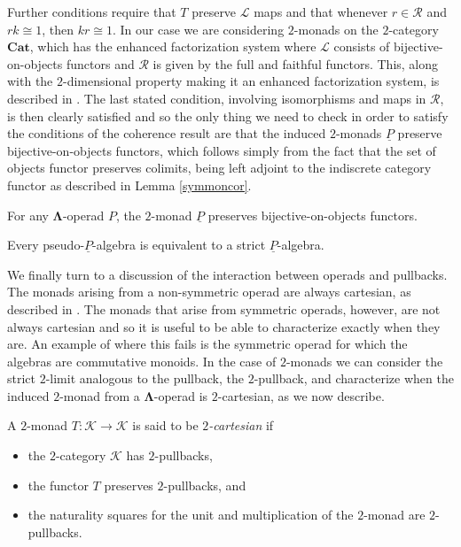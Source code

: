 \documentclass{amsbook} %
\newcommand{\m}[1]{\mathcal{#1}}
\newcommand{\ML}{\mathbf{\Lambda}}
\numberwithin{section}{chapter}
\begin{document}
Further conditions require that $T$ preserve $\mathcal{L}$ maps and that whenever $r \in \mathcal{R}$ and $rk \cong 1$, then $kr \cong 1$. In our case we are considering $2$-monads on the $2$-category $\mathbf{Cat}$, which has the enhanced factorization system where $\m{L}$ consists of bijective-on-objects functors and $\m{R}$ is given by the full and faithful functors. This, along with the $2$-dimensional property making it an enhanced factorization system, is described in \cite{power-gen}. The last stated condition, involving isomorphisms and maps in $\m{R}$, is then clearly satisfied and so the only thing we need to check in order to satisfy the conditions of the coherence result are that the induced $2$-monads $\underline{P}$ preserve bijective-on-objects functors, which follows simply from the fact that the set of objects functor preserves colimits, being left adjoint to the indiscrete category functor as described in Lemma \ref{symmoncor}.

\begin{prop}
For any $\ML$-operad $P$, the $2$-monad $\underline{P}$ preserves bijective-on-objects functors.
\end{prop}
\begin{cor}
Every pseudo-$\underline{P}$-algebra is equivalent to a strict $\underline{P}$-algebra.
\end{cor}



We finally turn to a discussion of the interaction between operads and pullbacks.  The monads arising from a non-symmetric operad are always cartesian, as described in \cite{leinster}. The monads that arise from symmetric operads, however, are not always cartesian and so it is useful to be able to characterize exactly when they are. An example of where this fails is the symmetric operad for which the algebras are commutative monoids. In the case of $2$-monads we can consider the  strict $2$-limit analogous to the pullback, the $2$-pullback, and characterize when the induced $2$-monad from a $\ML$-operad is $2$-cartesian, as we now describe.

\begin{Defi}
A $2$-monad $T \colon \mathcal{K} \rightarrow \mathcal{K}$ is said to be \textit{$2$-cartesian} if
    \begin{itemize}
        \item the $2$-category $\mathcal{K}$ has $2$-pullbacks,
        \item the functor $T$ preserves $2$-pullbacks, and
        \item the naturality squares for the unit and multiplication of the $2$-monad are $2$-pullbacks.
    \end{itemize}
\end{Defi}
\end{document}
